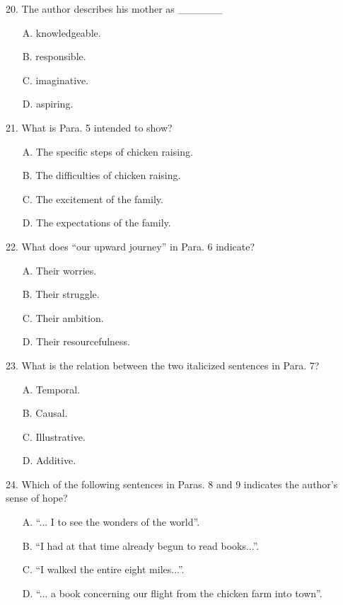 \documentclass[UTF8,11pt]{ctexart}
\begin{document}
20. The author describes his mother as \_\_\_\_\_\_


\begin{itemize}[leftmargin=2em,itemsep=.2em,topsep=.4em]\item[A.] knowledgeable.
\item[B.] responsible.
\item[C.] imaginative.
\item[D.] aspiring.
\end{itemize}

21. What is Para. 5 intended to show?


\begin{itemize}[leftmargin=2em,itemsep=.2em,topsep=.4em]\item[A.] The specific steps of chicken raising.
\item[B.] The difficulties of chicken raising.
\item[C.] The excitement of the family.
\item[D.] The expectations of the family.
\end{itemize}

22. What does “our upward journey” in Para. 6 indicate?


\begin{itemize}[leftmargin=2em,itemsep=.2em,topsep=.4em]\item[A.] Their worries.
\item[B.] Their struggle.
\item[C.] Their ambition.
\item[D.] Their resourcefulness.
\end{itemize}

23. What is the relation between the two italicized sentences in Para. 7?


\begin{itemize}[leftmargin=2em,itemsep=.2em,topsep=.4em]\item[A.] Temporal.
\item[B.] Causal.
\item[C.] Illustrative.
\item[D.] Additive.
\end{itemize}

24. Which of the following sentences in Paras. 8 and 9 indicates the author’s sense of hope?


\begin{itemize}[leftmargin=2em,itemsep=.2em,topsep=.4em]\item[A.] “... I to see the wonders of the world”.
\item[B.] “I had at that time already begun to read books...”.
\item[C.] “I walked the entire eight miles...”.
\item[D.] “... a book concerning our flight from the chicken farm into town”.
\end{itemize}
\end{document}
